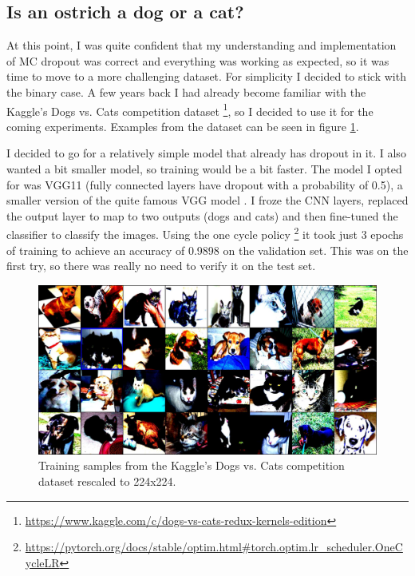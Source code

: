 \documentclass[11pt]{article}
\begin{document}
\subsection{Is an ostrich a dog or a cat?}

At this point, I was quite confident that my understanding and implementation of MC dropout was correct and everything was working as expected, so it was time to move to a more challenging dataset. For simplicity I decided to stick with the binary case. A few years back I had already become familiar with the Kaggle's Dogs vs. Cats competition dataset \footnote{\url{https://www.kaggle.com/c/dogs-vs-cats-redux-kernels-edition}}, so I decided to use it for the coming experiments. Examples from the dataset can be seen in figure \ref{fig:cats-dogs}.

I decided to go for a relatively simple model that already has dropout in it. I also wanted a bit smaller model, so training would be a bit faster. The model I opted for was VGG11 (fully connected layers have dropout with a probability of 0.5), a smaller version of the quite famous VGG model \cite{simonyan15}. I froze the CNN layers, replaced the output layer to map to two outputs (dogs and cats) and then fine-tuned the classifier to classify the images. Using the one cycle policy \footnote{\url{https://pytorch.org/docs/stable/optim.html\#torch.optim.lr_scheduler.OneCycleLR}} it took just 3 epochs of training to achieve an accuracy of 0.9898 on the validation set. This was on the first try, so there was really no need to verify it on the test set.

\begin{figure}
    \center
    \includegraphics[scale=0.2]{images/cats-dogs}
    \caption{Training samples from the Kaggle's Dogs vs. Cats competition dataset rescaled to 224x224.}
    \label{fig:cats-dogs}
\end{figure}
\end{document}
